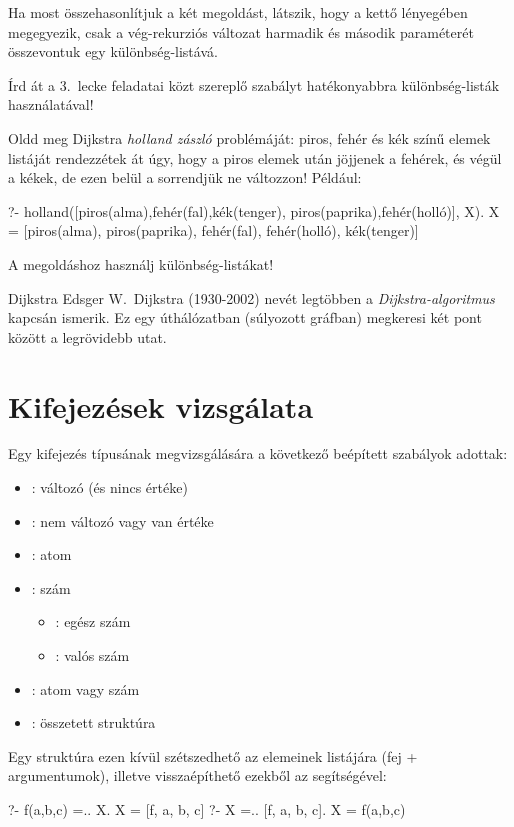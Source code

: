 Ha most összehasonlítjuk a két megoldást, látszik,
hogy a kettő lényegében megegyezik, csak a
vég-rekurziós változat harmadik és második
paraméterét összevontuk egy különbség-listává.

\begin{problem}
Írd át a 3.~lecke feladatai közt szereplő
 szabályt hatékonyabbra különbség-listák
használatával!
\end{problem}
\begin{problem}
Oldd meg Dijkstra \emph{holland zászló}
problémáját: piros, fehér és kék színű elemek
listáját rendezzétek át úgy, hogy a piros elemek
után jöjjenek a fehérek, és végül a kékek, de ezen
belül a sorrendjük ne változzon! Például:
\begin{query}
?- holland([piros(alma),fehér(fal),kék(tenger),
            piros(paprika),fehér(holló)], X).
X = [piros(alma), piros(paprika), fehér(fal),
     fehér(holló), kék(tenger)]
\end{query}
A megoldáshoz használj különbség-listákat!
\end{problem}

\begin{infobox}{}{Dijkstra}
Edsger W.~Dijkstra (1930-2002) nevét legtöbben a
\emph{Dijkstra-algoritmus} kapcsán ismerik. Ez egy
úthálózatban (súlyozott gráfban) megkeresi két pont
között a legrövidebb utat.
\end{infobox}

\section{Kifejezések vizsgálata}
Egy kifejezés típusának megvizsgálására a következő
beépített szabályok adottak:
\begin{itemize}
\item {} :  változó (és nincs értéke)
\item {} :  nem változó vagy van értéke
\item {} :  atom
\item {} :  szám
  \begin{itemize}
    \item {} :  egész szám
    \item {} :  valós szám
  \end{itemize}
\item {} :  atom vagy szám
\item {} :  összetett struktúra
\end{itemize}
Egy struktúra ezen kívül szétszedhető az elemeinek
listájára (fej + argumentumok), illetve
visszaépíthető ezekből az  segítségével:
\begin{query}
?- f(a,b,c) =.. X.
X = [f, a, b, c]
?- X =.. [f, a, b, c].
X = f(a,b,c)
\end{query}


